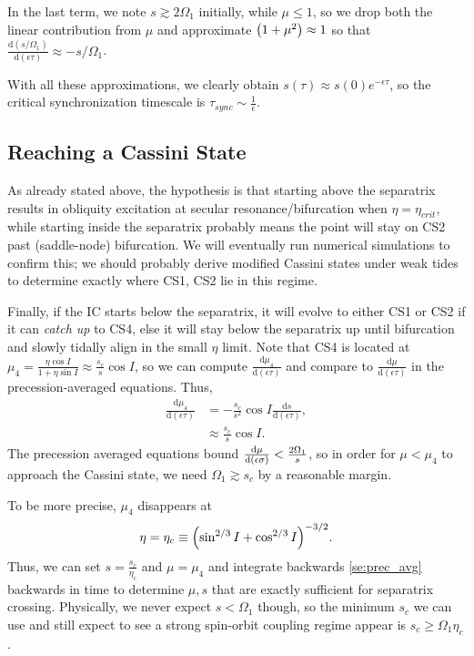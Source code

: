 \documentclass[11pt,
        usenames, %
        dvipsnames %
    ]{article}
\newcommand*{\rd}[2]{\frac{\mathrm{d}#1}{\mathrm{d}#2}}
\DeclarePairedDelimiter\p{\lparen}{\rparen}
\begin{document}
In the last term, we note $s \gtrsim 2\Omega_1$ initially, while $\mu \leq 1$,
so we drop both the linear contribution from $\mu$ and approximate $\p*{1 +
\mu^2} \approx 1$ so that $\rd{(s/\Omega_1)}{(\epsilon\tau)} \approx
-s/\Omega_1$.

With all these approximations, we clearly obtain $s(\tau) \approx
s(0)e^{-\epsilon \tau}$, so the critical synchronization
timescale is $\tau_{sync} \sim \frac{1}{\epsilon}$.

\subsection{Reaching a Cassini State}

As already stated above, the hypothesis is that starting above the separatrix
results in obliquity excitation at secular resonance/bifurcation when $\eta =
\eta_{crit}$, while starting inside the separatrix probably means the point will
stay on CS2 past (saddle-node) bifurcation. We will eventually run numerical
simulations to confirm this; we should probably derive modified Cassini states
under weak tides to determine exactly where CS1, CS2 lie in this regime.

Finally, if the IC starts below the separatrix, it will evolve to either CS1 or
CS2 if it can \emph{catch up} to CS4, else it will stay below the separatrix up
until bifurcation and slowly tidally align in the small $\eta$ limit. Note that
CS4 is located at $\mu_4 = \frac{\eta \cos I}{1 + \eta \sin I} \approx
\frac{s_c}{s}\cos I$, so we can compute $\rd{\mu_4}{(\epsilon\tau)}$ and compare
to $\rd{\mu}{(\epsilon\tau)}$ in the precession-averaged equations. Thus,
\begin{align*}
    \rd{\mu_4}{(\epsilon \tau)} &= -\frac{s_c}{s^2}\cos I
            \rd{s}{(\epsilon\tau)},\\
        &\approx \frac{s_c}{s}\cos I.
\end{align*}
The precession averaged equations bound $\rd{\mu}{\p*{\epsilon\sigma}} <
\frac{2\Omega_1}{s}$, so in order for $\mu < \mu_4$ to approach the Cassini
state, we need $\Omega_1 \gtrsim s_c$ by a reasonable margin.

To be more precise, $\mu_4$ disappears at
\begin{equation}
    \eta = \eta_c \equiv \p*{\sin^{2/3}I + \cos^{2/3}I}^{-3/2}.
\end{equation}
Thus, we can set $s = \frac{s_c}{\eta_c}$ and $\mu = \mu_4$ and integrate
backwards \autoref{se:prec_avg} backwards in time to determine $\mu, s$ that are
exactly sufficient for separatrix crossing. Physically, we never expect $s <
\Omega_1$ though, so the minimum $s_c$ we can use and still expect to see a
strong spin-orbit coupling regime appear is $s_c \geq \Omega_1 \eta_c$.
\end{document}
